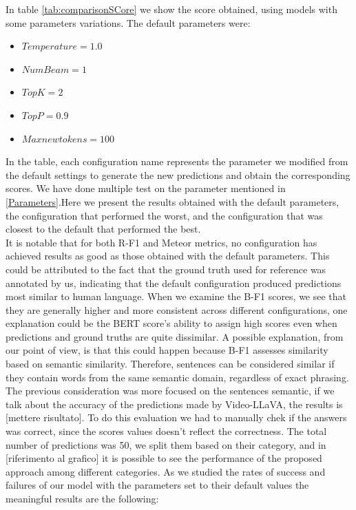 \documentclass[conference]{IEEEtran}
\begin{document}
In table \ref{tab:comparisonSCore} we show the score obtained, using models with some parameters variations.
The default parameters were:
\begin{itemize}[before=\footnotesize]
    \item $Temperature = 1.0$
    \item $Num Beam = 1$
    \item $Top K = 2$
    \item $Top P = 0.9$
    \item $Max new tokens = 100$
\end{itemize}
In the table, each configuration name represents the parameter we modified from the default settings to generate the new predictions and obtain the corresponding scores.
We have done multiple test on the parameter mentioned in \ref{Parameters}.Here we present the results obtained with the default parameters, the configuration that performed the worst, and the configuration that was closest to the default that performed the best.\\
It is notable that for both R-F1 and Meteor metrics, no configuration has achieved results as good as those obtained with the default parameters. This could be attributed to the fact that the ground truth used for reference was annotated by us, indicating that the default configuration produced predictions most similar to human language. When we examine the B-F1 scores, we see that they are generally higher and more consistent across different configurations, one explanation could be the BERT score's ability to assign high scores even when predictions and ground truths are quite dissimilar. A possible explanation, from our point of view, is that this could happen because B-F1 assesses similarity based on semantic similarity. Therefore, sentences can be considered similar if they contain words from the same semantic domain, regardless of exact phrasing.
\\
The previous consideration was more focused on the sentences semantic, if we talk about the accuracy of the predictions made by Video-LLaVA, the results is [mettere risultato]. To do this evaluation we had to manually chek if the answers was correct, since the scores values doesn't reflect the correctness. The total number of predictions was 50, we split them based on their category, and in [riferimento al grafico] it is possible to see the performance of the proposed approach among different categories.
As we studied the rates of success and failures of our model with the parameters set to their default values the meaningful results are the following: \\
\end{document}
